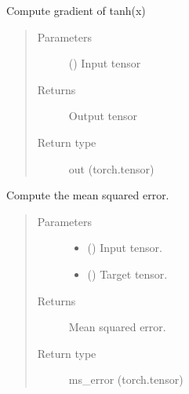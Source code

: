 \documentclass[letterpaper,10pt,english]{sphinxmanual}
\begin{document}

\begin{fulllineitems}
\label{\detokenize{nn:nn.functional.d_tanh}}
Compute gradient of tanh(x)
\begin{quote}\begin{description}
\item[{Parameters}] \leavevmode
{} () \textendash{} Input tensor

\item[{Returns}] \leavevmode
Output tensor

\item[{Return type}] \leavevmode
out (torch.tensor)

\end{description}\end{quote}

\end{fulllineitems}


\begin{fulllineitems}
\label{\detokenize{nn:nn.functional.mse}}
Compute the mean squared error.
\begin{quote}\begin{description}
\item[{Parameters}] \leavevmode\begin{itemize}
\item {} 
 () \textendash{} Input tensor.

\item {} 
 () \textendash{} Target tensor.

\end{itemize}

\item[{Returns}] \leavevmode
Mean squared error.

\item[{Return type}] \leavevmode
ms\_error (torch.tensor)

\end{description}\end{quote}

\end{fulllineitems}
\end{document}
